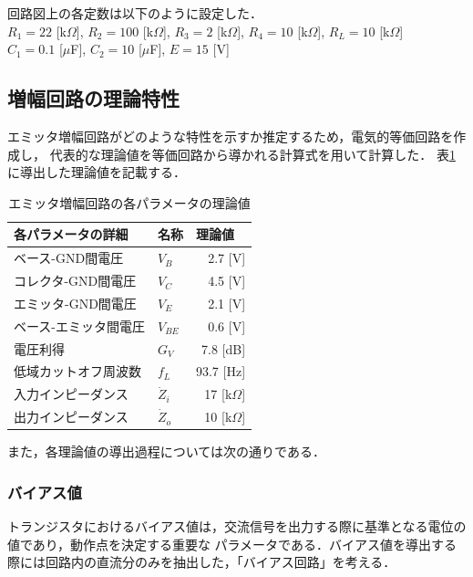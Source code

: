 \documentclass[dvipdfmx,titlepage,a4j]{jsarticle}  %
\numberwithin{equation}{section}
\begin{document}
回路図上の各定数は以下のように設定した．\\
$R_1 = 22$ [k$\Omega$], $R_2 = 100$ [k$\Omega$], $R_3 = 2$ [k$\Omega$], $R_4 = 10$ [k$\Omega$], $R_L = 10$ [k$\Omega$]\\
$C_1 = 0.1$ [$\mu$F], $C_2 = 10$ [$\mu$F], $E = 15$ [V]

\subsection{増幅回路の理論特性}
エミッタ増幅回路がどのような特性を示すか推定するため，電気的等価回路を作成し，
代表的な理論値を等価回路から導かれる計算式を用いて計算した．
表\ref{tbl:tr;the}に導出した理論値を記載する．

\begin{table}[htbp]
  \caption{エミッタ増幅回路の各パラメータの理論値}
  \begin{center}
    \begin{tabular}{l|l|r}
      \hline
      各パラメータの詳細    & 名称        & \multicolumn{1}{l}{理論値} \\ \hline \hline
      ベース-GND間電圧      & $V_B$       & 2.7 [V]                    \\ \hline
      コレクタ-GND間電圧    & $V_C$       & 4.5 [V]                    \\ \hline
      エミッタ-GND間電圧    & $V_E$       & 2.1 [V]                    \\ \hline
      ベース-エミッタ間電圧 & $V_{BE}$    & 0.6 [V]                    \\ \hline
      電圧利得              & $G_V$       & 7.8 [dB]                   \\ \hline
      低域カットオフ周波数  & $f_L$       & 93.7 [Hz]                  \\ \hline
      入力インピーダンス    & $\dot{Z}_i$ & 17 [k$\Omega$]             \\ \hline
      出力インピーダンス    & $\dot{Z}_o$ & 10 [k$\Omega$]             \\ \hline
    \end{tabular}
  \end{center}
  \label{tbl:tr;the}
\end{table}

また，各理論値の導出過程については次の通りである．

\subsubsection{バイアス値}
トランジスタにおけるバイアス値は，交流信号を出力する際に基準となる電位の値であり，動作点を決定する重要な
パラメータである．バイアス値を導出する際には回路内の直流分のみを抽出した，「バイアス回路」を考える．
\end{document}
